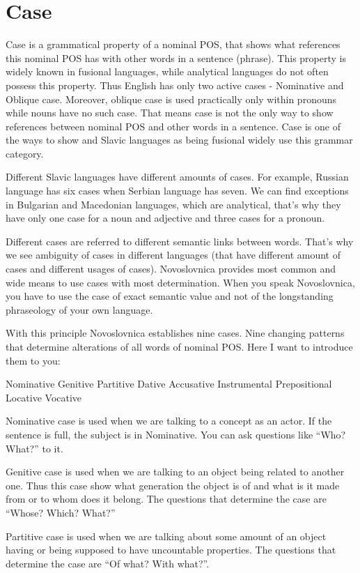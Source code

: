 \section{Case}

Case is a grammatical property of a nominal POS, that shows what references this nominal POS has with other words in a sentence (phrase). This property is widely known in fusional languages, while analytical languages do not often possess this property. Thus English has only two active cases - Nominative and Oblique case. Moreover, oblique case is used practically only within pronouns while nouns have no such case. That means case is not the only way to show references between nominal POS and other words in a sentence. Case is one of the ways to show and Slavic languages as being fusional widely use this grammar category.

Different Slavic languages have different amounts of cases. For example, Russian language has six cases when Serbian language has seven. We can find exceptions in Bulgarian and Macedonian languages, which are analytical, that’s why they have only one case for a noun and adjective and three cases for a pronoun.

Different cases are referred to different semantic links between words. That’s why we see ambiguity of cases in different languages (that have different amount of cases and different usages of cases). Novoslovnica provides most common and wide means to use cases with most determination. When you speak Novoslovnica, you have to use the case of exact semantic value and not of the longstanding phraseology of your own language.

With this principle Novoslovnica establishes nine cases. Nine changing patterns that determine alterations of all words of nominal POS. Here I want to introduce them to you:

Nominative
Genitive
Partitive
Dative
Accusative
Instrumental
Prepositional
Locative
Vocative

Nominative case is used when we are talking to a concept as an actor. If the sentence is full, the subject is in Nominative. You can ask questions like “Who? What?” to it.

Genitive case is used when we are talking to an object being related to another one. Thus this case show what generation the object is of and what is it made from or to whom does it belong. The questions that determine the case are “Whose? Which? What?”

Partitive case is used when we are talking about some amount of an object having or being supposed to have uncountable properties. The questions that determine the case are “Of what? With what?”. 


